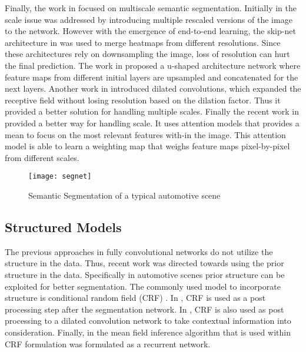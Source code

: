 \documentclass[conference]{IEEEtran}
\begin{document}
Finally, the work in \cite{yu2015multi}\cite{farabet2013learning}\cite{noh2015learning}\cite{chen2015attention}\cite{Qi_2016_CVPR}\cite{ronneberger2015u} focused on multiscale semantic segmentation. Initially in \cite{farabet2013learning} the scale issue was addressed by introducing multiple rescaled versions of the image to the network. However with the emergence of end-to-end learning, the skip-net architecture in \cite{long2015fully} was used to merge heatmaps from different resolutions. Since these architectures rely on downsampling the image, loss of resolution can hurt the final prediction. The work in \cite{ronneberger2015u} proposed a u-shaped architecture network where feature maps from different initial layers are upsampled and concatenated for the next layers. Another work in \cite{yu2015multi} introduced dilated convolutions, which expanded the receptive field without losing resolution based on the dilation factor. Thus it provided a better solution for handling multiple scales. Finally the recent work in \cite{chen2015attention} provided a better way for handling scale. It uses attention models that provides a mean to focus on the most relevant features with-in the image. This attention model is able to learn a weighting map that weighs feature maps pixel-by-pixel from different scales.

\begin{figure}[!t]
\centering
\texttt{[image: segnet]}
\caption{Semantic Segmentation of a typical automotive scene}
\label{segnet}
\end{figure}\subsection{Structured Models}
The previous approaches in fully convolutional networks do not utilize the structure in the data. Thus, recent work was directed towards using the prior structure in the data. Specifically in automotive scenes prior structure can be exploited for better segmentation. The commonly used model to incorporate structure is conditional random field (CRF) \cite{lin2015efficient}\cite{chen2016deeplab}\cite{zheng2015conditional}. In \cite{lin2015efficient}, CRF is used as a post processing step after the segmentation network. In \cite{chen2016deeplab}, CRF is also used as post processing to a dilated convolution network to take contextual information into consideration. Finally, in \cite{zheng2015conditional} the mean field inference algorithm that is used within CRF formulation was formulated as a recurrent network.
\end{document}
